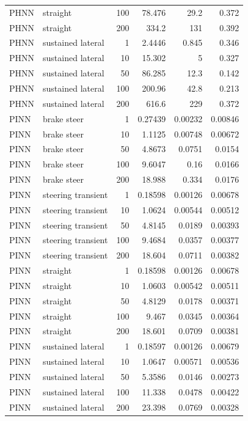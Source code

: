 \begin{tabular}{llrrrr}
PHNN & straight & 100 & 78.476 & 29.2 & 0.372 \\
PHNN & straight & 200 & 334.2 & 131 & 0.392 \\
PHNN & sustained lateral & 1 & 2.4446 & 0.845 & 0.346 \\
PHNN & sustained lateral & 10 & 15.302 & 5 & 0.327 \\
PHNN & sustained lateral & 50 & 86.285 & 12.3 & 0.142 \\
PHNN & sustained lateral & 100 & 200.96 & 42.8 & 0.213 \\
PHNN & sustained lateral & 200 & 616.6 & 229 & 0.372 \\
PINN & brake steer & 1 & 0.27439 & 0.00232 & 0.00846 \\
PINN & brake steer & 10 & 1.1125 & 0.00748 & 0.00672 \\
PINN & brake steer & 50 & 4.8673 & 0.0751 & 0.0154 \\
PINN & brake steer & 100 & 9.6047 & 0.16 & 0.0166 \\
PINN & brake steer & 200 & 18.988 & 0.334 & 0.0176 \\
PINN & steering transient & 1 & 0.18598 & 0.00126 & 0.00678 \\
PINN & steering transient & 10 & 1.0624 & 0.00544 & 0.00512 \\
PINN & steering transient & 50 & 4.8145 & 0.0189 & 0.00393 \\
PINN & steering transient & 100 & 9.4684 & 0.0357 & 0.00377 \\
PINN & steering transient & 200 & 18.604 & 0.0711 & 0.00382 \\
PINN & straight & 1 & 0.18598 & 0.00126 & 0.00678 \\
PINN & straight & 10 & 1.0603 & 0.00542 & 0.00511 \\
PINN & straight & 50 & 4.8129 & 0.0178 & 0.00371 \\
PINN & straight & 100 & 9.467 & 0.0345 & 0.00364 \\
PINN & straight & 200 & 18.601 & 0.0709 & 0.00381 \\
PINN & sustained lateral & 1 & 0.18597 & 0.00126 & 0.00679 \\
PINN & sustained lateral & 10 & 1.0647 & 0.00571 & 0.00536 \\
PINN & sustained lateral & 50 & 5.3586 & 0.0146 & 0.00273 \\
PINN & sustained lateral & 100 & 11.338 & 0.0478 & 0.00422 \\
PINN & sustained lateral & 200 & 23.398 & 0.0769 & 0.00328 \\

\end{tabular}
